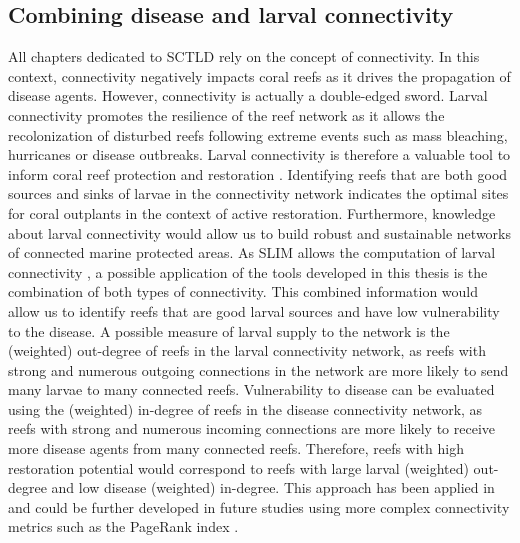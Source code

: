\subsection*{Combining disease and larval connectivity}
All chapters dedicated to SCTLD rely on the concept of connectivity. In this context, connectivity negatively impacts coral reefs as it drives the propagation of disease agents. However, connectivity is actually a double-edged sword. Larval connectivity promotes the resilience of the reef network as it allows the recolonization of disturbed reefs following extreme events such as mass bleaching, hurricanes or disease outbreaks. Larval connectivity is therefore a valuable tool to inform coral reef protection and restoration \citep{botsford2009connectivity,mumby2011reserve}. Identifying reefs that are both good sources and sinks of larvae in the connectivity network indicates the optimal sites for coral outplants in the context of active restoration. Furthermore, knowledge about larval connectivity would allow us to build robust and sustainable networks of connected marine protected areas. As SLIM allows the computation of larval connectivity \citep{thomas2014numerical,frys2020fine,figueiredo2021global}, a possible application of the tools developed in this thesis is the combination of both types of connectivity.  This combined information would allow us to identify reefs that are good larval sources and have low vulnerability to the disease. A possible measure of larval supply to the network is the (weighted) out-degree of reefs in the larval connectivity network, as reefs with strong and numerous outgoing connections in the network are more likely to send many larvae to many connected reefs. Vulnerability to disease can be evaluated using the (weighted) in-degree of reefs in the disease connectivity network, as reefs with strong and numerous incoming connections are more likely to receive more disease agents from many connected reefs. Therefore, reefs with high restoration potential would correspond to reefs with large larval (weighted) out-degree and low disease (weighted) in-degree. This approach has been applied in \cite{holstein2022} and could be further developed in future studies using more complex connectivity metrics such as the PageRank index \citep{frys2020fine}. 

